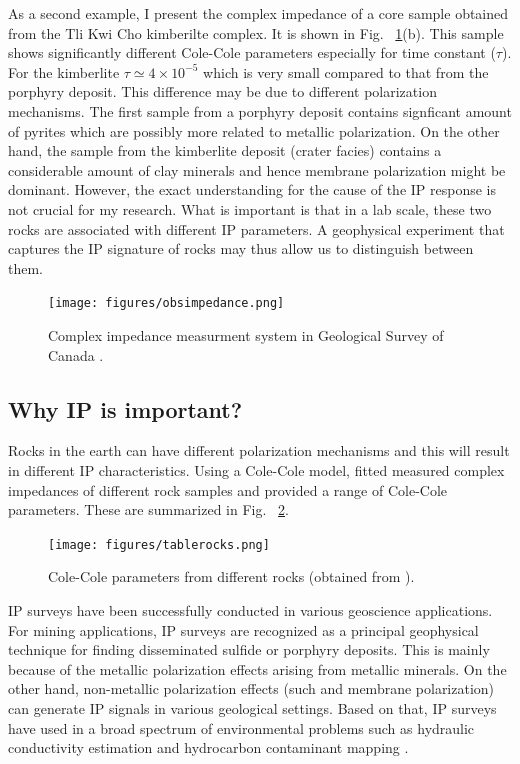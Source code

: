 \documentclass[letterpaper,11pt]{article}
\begin{document}
 As a second example, I present the complex impedance of a core sample obtained from the Tli Kwi Cho kimberilte complex. It is shown in Fig. ~\ref{Fig:obsimpedance}(b). This sample shows significantly different Cole-Cole parameters especially for time constant ($\tau$). For the kimberlite $\tau \simeq 4\times10^{-5}$ which is very small compared to that from the porphyry deposit. This difference may be due to different polarization mechanisms. The first sample from a porphyry deposit contains signficant amount of pyrites which are possibly more related to metallic polarization. On the other hand, the sample from the kimberlite deposit (crater facies) contains a considerable amount of clay minerals and hence membrane polarization might be dominant. However, the exact understanding for the cause of the IP response is not crucial for my research. What is important is that in a lab scale, these two rocks are associated with different IP parameters.  A geophysical experiment that captures the IP signature of rocks may thus allow us to distinguish between them. 

\begin{figure}[htb]
  \centering
  \texttt{[image: figures/obsimpedance.png]}
  \caption{Complex impedance measurment system in Geological Survey of Canada \cite[]{Enkin2012}. }
  \label{Fig:obsimpedance}
\end{figure}
\clearpage

\subsection{Why IP is important?}
Rocks in the earth can have different polarization mechanisms and this will result in different IP characteristics. Using a Cole-Cole model, \cite{Pelton1978} fitted measured complex impedances of different rock samples and provided a range of Cole-Cole parameters. These are summarized in  Fig. ~\ref{Fig:tablerocks}. 

\begin{figure}[htb]
  \centering
  \texttt{[image: figures/tablerocks.png]}
  \caption{Cole-Cole parameters from different rocks (obtained from \cite{Pelton1978}).}
  \label{Fig:tablerocks}
\end{figure}

IP surveys have been successfully conducted in various geoscience applications. For mining applications, IP surveys are recognized as a principal geophysical technique for finding disseminated sulfide or porphyry deposits. This is mainly because of the metallic polarization effects arising from metallic minerals. On the other hand, non-metallic polarization effects (such and membrane polarization) can generate IP signals in various geological settings. Based on that, IP surveys have used  in a broad spectrum of environmental problems such as hydraulic conductivity estimation and hydrocarbon contaminant mapping \cite[]{Kemna2012}. 
\end{document}
